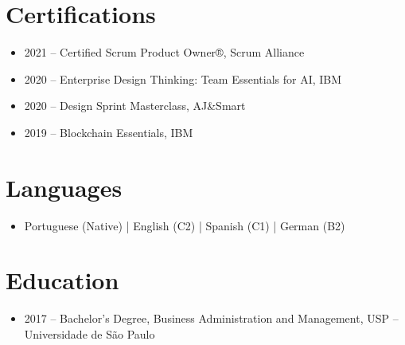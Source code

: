 \documentclass[11pt,a4paper]{article}
\begin{document}
\vspace{6pt}

\section*{Certifications}
\begin{itemize}[leftmargin=*, label=$\bullet$, itemsep=2pt, parsep=0pt]
\item 2021 – Certified Scrum Product Owner®, Scrum Alliance
\item 2020 – Enterprise Design Thinking: Team Essentials for AI, IBM
\item 2020 – Design Sprint Masterclass, AJ\&Smart
\item 2019 – Blockchain Essentials, IBM
\end{itemize}

\vspace{8pt}

\section*{Languages}
\begin{itemize}[leftmargin=*, label=$\bullet$, itemsep=2pt, parsep=0pt]
\item Portuguese (Native) \quad | \quad English (C2) \quad | \quad Spanish (C1) \quad | \quad German (B2)
\end{itemize}

\vspace{8pt}

\section*{Education}
\begin{itemize}[leftmargin=*, label=$\bullet$, itemsep=2pt, parsep=0pt]
\item 2017 – Bachelor's Degree, Business Administration and Management, USP – Universidade de São Paulo
\end{itemize}
\end{document}
